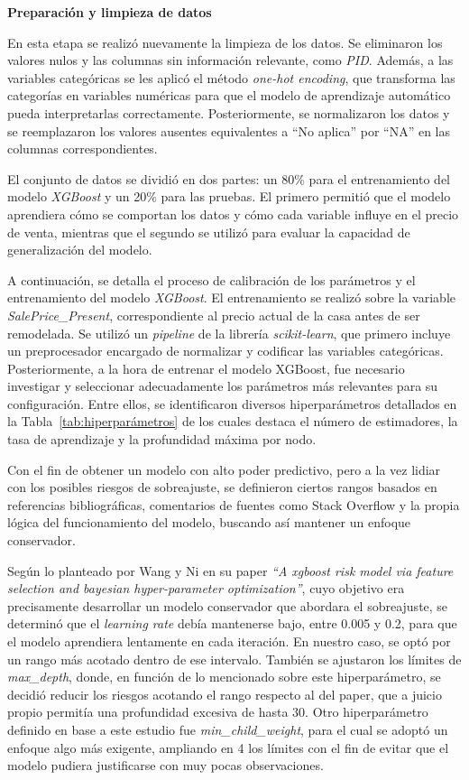 \noindent\textbf{Preparación y limpieza de datos}

En esta etapa se realizó nuevamente la limpieza de los datos. Se eliminaron los valores nulos y las columnas sin información relevante, como \textit{PID}. Además, a las variables categóricas se les aplicó el método \textit{one-hot encoding}, que transforma las categorías en variables numéricas para que el modelo de aprendizaje automático pueda interpretarlas correctamente.  Posteriormente, se normalizaron los datos y se reemplazaron los valores ausentes equivalentes a ``No aplica'' por ``NA'' en las columnas correspondientes.  

El conjunto de datos se dividió en dos partes: un 80\% para el entrenamiento del modelo \textit{XGBoost} y un 20\% para las pruebas. El primero permitió que el modelo aprendiera cómo se comportan los datos y cómo cada variable influye en el precio de venta, mientras que el segundo se utilizó para evaluar la capacidad de generalización del modelo.  

A continuación, se detalla el proceso de calibración de los parámetros y el entrenamiento del modelo \textit{XGBoost}. El entrenamiento se realizó sobre la variable \textit{SalePrice\_Present}, correspondiente al precio actual de la casa antes de ser remodelada.  Se utilizó un \textit{pipeline} de la librería \textit{scikit-learn}, que primero incluye un preprocesador encargado de normalizar y codificar las variables categóricas.  
Posteriormente, a la hora de entrenar el modelo XGBoost, fue necesario investigar y seleccionar adecuadamente los parámetros más relevantes para su configuración. Entre ellos, se identificaron diversos hiperparámetros detallados en la Tabla~\ref{tab:hiperparámetros} de los cuales destaca el número de estimadores, la tasa de aprendizaje y la profundidad máxima por nodo.

Con el fin de obtener un modelo con alto poder predictivo, pero a la vez lidiar con los posibles riesgos de sobreajuste, se definieron ciertos rangos basados en referencias bibliogr\'aficas, comentarios de fuentes como Stack Overflow y la propia l\'ogica del funcionamiento del modelo, buscando as\'i mantener un enfoque conservador.  

Seg\'un lo planteado por Wang y Ni \cite{wang2019xgboost} en su paper \textit{``A xgboost risk model via feature selection and bayesian hyper-parameter optimization''}, cuyo objetivo era precisamente desarrollar un modelo conservador que abordara el sobreajuste, se determin\'o que el \textit{learning rate} deb\'ia mantenerse bajo, entre 0.005 y 0.2, para que el modelo aprendiera lentamente en cada iteraci\'on. En nuestro caso, se opt\'o por un rango m\'as acotado dentro de ese intervalo. Tambi\'en se ajustaron los l\'imites de \textit{max\_depth}, donde, en funci\'on de lo mencionado sobre este hiperpar\'ametro, se decidi\'o reducir los riesgos acotando el rango respecto al del paper, que a juicio propio permit\'ia una profundidad excesiva de hasta 30. Otro hiperpar\'ametro definido en base a este estudio fue \textit{min\_child\_weight}, para el cual se adopt\'o un enfoque algo m\'as exigente, ampliando en 4 los l\'imites con el fin de evitar que el modelo pudiera justificarse con muy pocas observaciones.  

